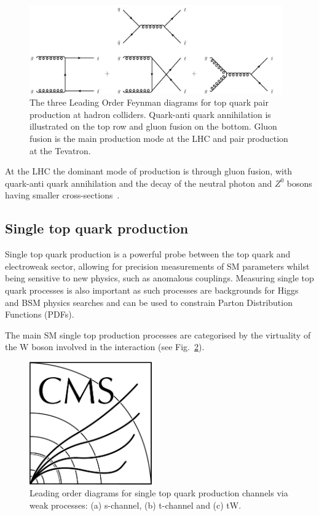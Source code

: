 \begin{figure}[htbp]
\begin{center}
\includegraphics[width=0.97\textwidth]{figs/top-physics/ttbar_feyn.jpg}
\caption{The three Leading Order Feynman diagrams for top quark pair production at hadron colliders. Quark-anti quark annihilation is illustrated on the top row and gluon fusion on the bottom. Gluon fusion is the main production mode at the LHC and pair production at the Tevatron.}
\label{fig:feyn_ttbar}
\end{center}
\end{figure}

At the LHC the dominant mode of production is through gluon fusion, with quark-anti quark annihilation and the decay of the neutral photon and $Z^{0}$ bosons having smaller cross-sections~\cite{Shibata:2008sy}.

\subsection{Single top quark production}\label{subsec:singleTopTheory}


Single top quark production is a powerful probe between the top quark and electroweak sector, allowing for precision measurements of SM parameters whilst being sensitive to new physics, such as anomalous couplings.
Measuring single top quark processes is also important as such processes are backgrounds for Higgs and BSM physics searches and can be used to constrain Parton Distribution Functions (PDFs).	

The main SM single top production processes are categorised by the virtuality of the W boson involved in the interaction (see Fig.~\ref{fig:singleTopDiagrams}).

\begin{figure}[!h]
\centering
\includegraphics[width=0.47\textwidth]{CMS-bw-logo.pdf}
\caption{Leading order diagrams for single top quark production channels via weak processes: (a) s-channel, (b) t-channel and (c) tW.}
\label{fig:singleTopDiagrams}
\end{figure}

